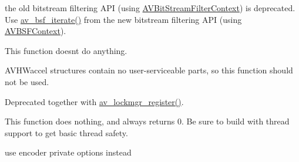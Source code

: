 \begin{DoxyRefList}
\item[Member \mbox{\hyperlink{group__lavc__misc_gaa27401d773a9f24c37774c6c3bfac4f4}{av\+\_\+bitstream\+\_\+filter\+\_\+next}} (const \mbox{\hyperlink{struct_a_v_bit_stream_filter}{A\+V\+Bit\+Stream\+Filter}} $\ast$f)]\label{deprecated__deprecated000025}%
%
the old bitstream filtering A\+PI (using \mbox{\hyperlink{struct_a_v_bit_stream_filter_context}{A\+V\+Bit\+Stream\+Filter\+Context}}) is deprecated. Use \mbox{\hyperlink{group__lavc__core_gaff3224f9026f829d25557cf85c9e9e12}{av\+\_\+bsf\+\_\+iterate()}} from the new bitstream filtering A\+PI (using \mbox{\hyperlink{struct_a_v_b_s_f_context}{A\+V\+B\+S\+F\+Context}}).  
\item[Member \mbox{\hyperlink{group__lavc__misc_ga79b2b1fe93195e596fa39676c5c4a295}{av\+\_\+register\+\_\+hwaccel}} (\mbox{\hyperlink{struct_a_v_h_w_accel}{A\+V\+H\+W\+Accel}} $\ast$hwaccel)]\label{deprecated__deprecated000026}%
%
This function doesn\textquotesingle{}t do anything.  
\item[Member \mbox{\hyperlink{group__lavc__misc_ga0052a521b299a70ac2dbad786805ec2e}{av\+\_\+hwaccel\+\_\+next}} (const \mbox{\hyperlink{struct_a_v_h_w_accel}{A\+V\+H\+W\+Accel}} $\ast$hwaccel)]\label{deprecated__deprecated000027}%
%
A\+V\+H\+Waccel structures contain no user-\/serviceable parts, so this function should not be used.  
\item[Member \mbox{\hyperlink{group__lavc__misc_ga7a013315e444069ec9630ddf3edce3f8}{A\+V\+Lock\+Op}} ]\label{deprecated__deprecated000028}%
%
Deprecated together with \mbox{\hyperlink{group__lavc__misc_ga4e9a0032df8f76cc766846514cebfab7}{av\+\_\+lockmgr\+\_\+register()}}.  
\item[Member \mbox{\hyperlink{group__lavc__misc_ga4e9a0032df8f76cc766846514cebfab7}{av\+\_\+lockmgr\+\_\+register}} (int($\ast$cb)(void $\ast$$\ast$mutex, enum A\+V\+Lock\+Op op))]\label{deprecated__deprecated000029}%
%
This function does nothing, and always returns 0. Be sure to build with thread support to get basic thread safety.  
\item[Member \mbox{\hyperlink{struct_a_v_codec_context_add88a2de1b8e5a8f022e5e7a4ae9397f}{A\+V\+Codec\+Context\+::b\+\_\+frame\+\_\+strategy}} ]\label{deprecated__deprecated000030}%
%
use encoder private options instead  
\item[Member \mbox{\hyperlink{struct_a_v_codec_context_a8f55996c04011fe1e89fdde14860efe9}{A\+V\+Codec\+Context\+::mpeg\+\_\+quant}} ]\label{deprecated__deprecated000031}%
$$
\end{DoxyRefList}
